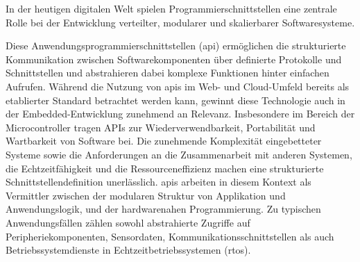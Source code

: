 

In der heutigen digitalen Welt spielen Programmierschnittstellen eine zentrale Rolle bei der Entwicklung verteilter, modularer und skalierbarer Softwaresysteme. 

Diese Anwendungsprogrammierschnittstellen (\gls{api}) ermöglichen die strukturierte Kommunikation zwischen Softwarekomponenten über definierte Protokolle und Schnittstellen und abstrahieren dabei komplexe Funktionen hinter einfachen Aufrufen.
Während die Nutzung von \gls{api}s im Web- und Cloud-Umfeld bereits als etablierter Standard betrachtet werden kann, gewinnt diese Technologie auch in der Embedded-Entwicklung zunehmend an Relevanz.
Insbesondere im Bereich der Microcontroller tragen APIs zur Wiederverwendbarkeit, Portabilität und Wartbarkeit von Software bei.
Die zunehmende Komplexität eingebetteter Systeme sowie die Anforderungen an die Zusammenarbeit mit anderen Systemen, die Echtzeitfähigkeit und  die Ressourceneffizienz machen eine strukturierte Schnittstellendefinition unerlässlich.
\gls{api}s arbeiten in diesem Kontext als Vermittler zwischen der modularen Struktur von Applikation und Anwendungslogik, und der hardwarenahen Programmierung.
Zu typischen Anwendungsfällen zählen sowohl abstrahierte Zugriffe auf Peripheriekomponenten, Sensordaten, Kommunikationsschnittstellen als auch Betriebssystemdienste in Echtzeitbetriebssystemen (\gls{rtos}).